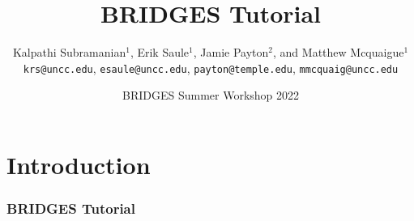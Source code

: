 \documentclass[aspectratio=169]{beamer}
\title{BRIDGES Tutorial}
\subtitle{}
\author{Kalpathi Subramanian$^1$, Erik Saule$^1$, Jamie Payton$^2$, and Matthew Mcquaigue$^1$ \\\texttt{krs@uncc.edu}, \texttt{esaule@uncc.edu}, \texttt{payton@temple.edu}, \texttt{mmcquaig@uncc.edu}}
\institute{$^1$The University of North Carolina at Charlotte\\$^2$Temple University}
\date{BRIDGES Summer Workshop 2022}
\begin{document}
\begin{frame}
\titlepage
\end{frame}



\section{Introduction}

\begin{frame}
  \frametitle{BRIDGES Tutorial}
\end{frame}
\end{document}
